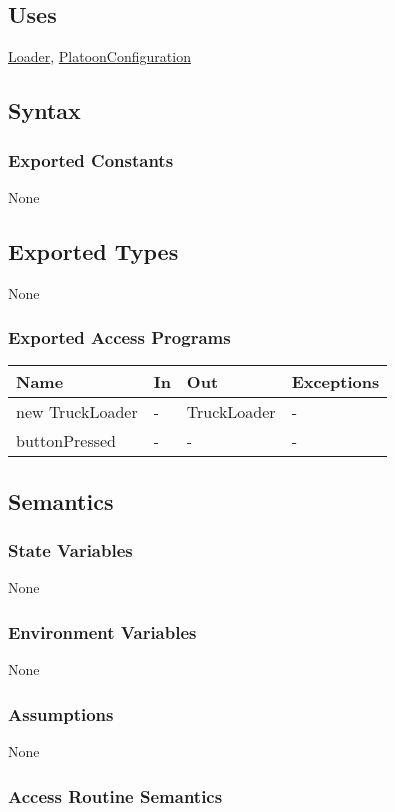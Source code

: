 \documentclass[12pt, titlepage]{article}
\begin{document}
\subsection{Uses}
\hyperref[Loader]{Loader}, \hyperref[PlatoonConfiguration]{PlatoonConfiguration}

\subsection{Syntax}

\subsubsection{Exported Constants}
None
\subsection{Exported Types}
None

\subsubsection{Exported Access Programs}
\begin{center}
\begin{tabular}{p{5cm} p{2cm} p{4cm} p{5.5cm}}
\hline
\textbf{Name} & \textbf{In} & \textbf{Out} & \textbf{Exceptions} \\
\hline
new TruckLoader & - & TruckLoader & - \\
\hline
buttonPressed & - & - & - \\
\hline
\end{tabular}
\end{center}

\subsection{Semantics}

\subsubsection{State Variables}
None
\subsubsection{Environment Variables}
None
\subsubsection{Assumptions}
None
\subsubsection{Access Routine Semantics}
\end{document}

